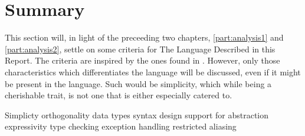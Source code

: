\section{Summary}\label{analsum}

This section will, in light of the preceeding two chapters, \cref{part:analysis1} and \cref{part:analysis2}, settle on some criteria for The Language Described in this Report. The criteria are inspired by the ones found in . However, only those characteristics which differentiates the language will be discussed, even if it might be present in the language. Such would be simplicity, which while being a cherishable trait, is not one that is either especially catered to.



Simplicty
orthogonality
data types
syntax design
support for abstraction
expressivity
type checking
exception handling
restricted aliasing

